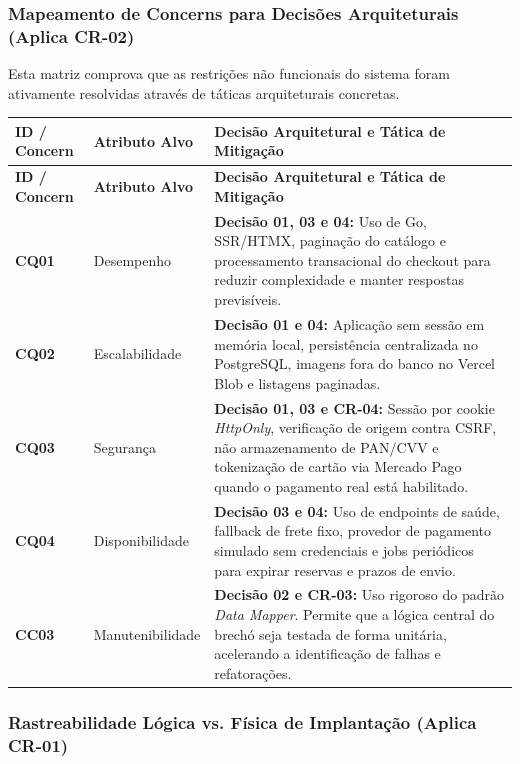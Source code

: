 \documentclass[12pt, a4paper]{article}
\begin{document}
\subsubsection{Mapeamento de Concerns para Decisões Arquiteturais (Aplica CR-02)}

Esta matriz comprova que as restrições não funcionais do sistema foram ativamente resolvidas através de táticas arquiteturais concretas.

\begin{longtable}{|p{2cm}|p{3.5cm}|p{8.5cm}|}
\hline
\textbf{ID / Concern} & \textbf{Atributo Alvo} & \textbf{Decisão Arquitetural e Tática de Mitigação} \\
\hline
\endfirsthead
\hline
\textbf{ID / Concern} & \textbf{Atributo Alvo} & \textbf{Decisão Arquitetural e Tática de Mitigação} \\
\hline
\endhead
\textbf{CQ01} & Desempenho & \textbf{Decisão 01, 03 e 04:} Uso de Go, SSR/HTMX, paginação do catálogo e processamento transacional do checkout para reduzir complexidade e manter respostas previsíveis. \\
\hline
\textbf{CQ02} & Escalabilidade & \textbf{Decisão 01 e 04:} Aplicação sem sessão em memória local, persistência centralizada no PostgreSQL, imagens fora do banco no Vercel Blob e listagens paginadas. \\
\hline
\textbf{CQ03} & Segurança & \textbf{Decisão 01, 03 e CR-04:} Sessão por cookie \textit{HttpOnly}, verificação de origem contra CSRF, não armazenamento de PAN/CVV e tokenização de cartão via Mercado Pago quando o pagamento real está habilitado. \\
\hline
\textbf{CQ04} & Disponibilidade & \textbf{Decisão 03 e 04:} Uso de endpoints de saúde, fallback de frete fixo, provedor de pagamento simulado sem credenciais e jobs periódicos para expirar reservas e prazos de envio. \\
\hline
\textbf{CC03} & Manutenibilidade & \textbf{Decisão 02 e CR-03:} Uso rigoroso do padrão \textit{Data Mapper}. Permite que a lógica central do brechó seja testada de forma unitária, acelerando a identificação de falhas e refatorações. \\
\hline
\end{longtable}

\subsubsection{Rastreabilidade Lógica vs. Física de Implantação (Aplica CR-01)}
\end{document}
